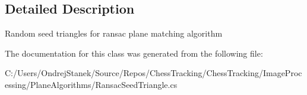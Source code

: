 \subsection{Detailed Description}
Random seed triangles for ransac plane matching algorithm 



The documentation for this class was generated from the following file\+:\begin{DoxyCompactItemize}
\item 
C\+:/\+Users/\+Ondrej\+Stanek/\+Source/\+Repos/\+Chess\+Tracking/\+Chess\+Tracking/\+Image\+Processing/\+Plane\+Algorithms/Ransac\+Seed\+Triangle.\+cs\end{DoxyCompactItemize}
